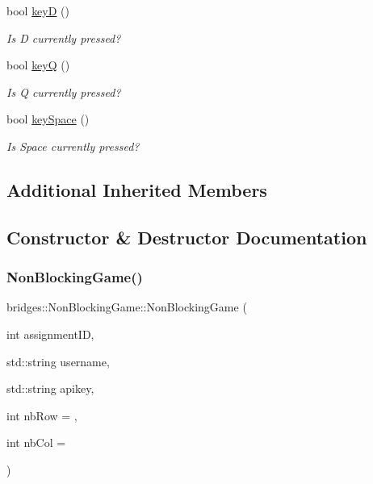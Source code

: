 \begin{DoxyCompactItemize}
bool \hyperlink{classbridges_1_1_non_blocking_game_a7ebf6dfd3b518a2f8a2444100bb48b00}{keyD} ()
\begin{DoxyCompactList}\small\item\em Is D currently pressed? \end{DoxyCompactList}\item 
bool \hyperlink{classbridges_1_1_non_blocking_game_a57943be21a533b82cf3ad4032b811f2a}{keyQ} ()
\begin{DoxyCompactList}\small\item\em Is Q currently pressed? \end{DoxyCompactList}\item 
bool \hyperlink{classbridges_1_1_non_blocking_game_a64026cee1cd106ec27e9be0f0f6cf563}{key\+Space} ()
\begin{DoxyCompactList}\small\item\em Is Space currently pressed? \end{DoxyCompactList}\end{DoxyCompactItemize}
\subsection*{Additional Inherited Members}


\subsection{Constructor \& Destructor Documentation}
\mbox{\label{classbridges_1_1_non_blocking_game_a20f86921385a88b6fee3e10484ea444e}} 
\subsubsection{\texorpdfstring{Non\+Blocking\+Game()}{NonBlockingGame()}}
{\footnotesize\ttfamily bridges\+::\+Non\+Blocking\+Game\+::\+Non\+Blocking\+Game (\begin{DoxyParamCaption}\item[{int}]{assignment\+ID,  }\item[{std\+::string}]{username,  }\item[{std\+::string}]{apikey,  }\item[{int}]{nb\+Row = {},  }\item[{int}]{nb\+Col = {} }\end{DoxyParamCaption})\hspace{0.3cm}{\ttfamily [inline]}}



